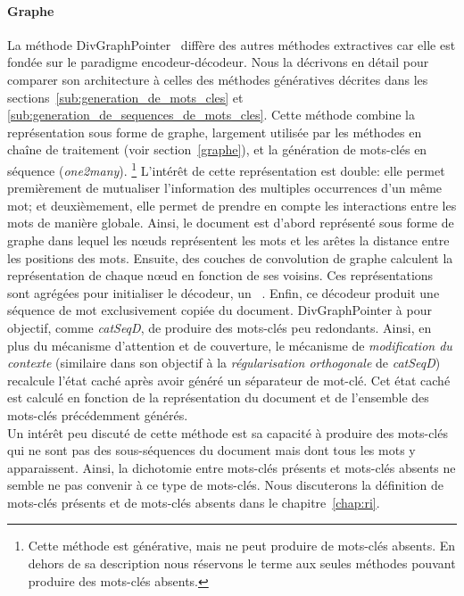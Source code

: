 \paragraph{Graphe}
La méthode DivGraphPointer~\cite{sun_divgraphpointer_2019} diffère des autres méthodes extractives car elle est fondée sur le paradigme encodeur-décodeur.
Nous la décrivons en détail pour comparer son architecture à celles des méthodes génératives décrites dans les sections~\ref{sub:generation_de_mots_cles} et \ref{sub:generation_de_sequences_de_mots_cles}.
%
Cette méthode combine la représentation sous forme de graphe, largement utilisée par les méthodes en chaîne de traitement (voir section~\ref{graphe}), et la génération de mots-clés en séquence (\emph{one2many}).%
\footnote{Cette méthode est générative, mais ne peut produire de mots-clés absents. En dehors de sa description nous réservons le terme  aux seules méthodes pouvant produire des mots-clés absents.}
L'intérêt de cette représentation est double: elle permet premièrement de mutualiser l'information des multiples occurrences d'un même mot; et deuxièmement, elle permet de prendre en compte les interactions entre les mots de manière globale.
%
Ainsi, le document est d'abord représenté sous forme de graphe dans lequel les n\oe{}uds représentent les mots et les arêtes la distance entre les positions des mots.
Ensuite, des couches de convolution de graphe calculent la représentation de chaque n\oe{}ud en fonction de ses voisins.
Ces représentations sont agrégées pour initialiser le décodeur, un ~\cite{vinyals_order_2016}.
Enfin, ce décodeur produit une séquence de mot exclusivement copiée du document.
%
DivGraphPointer à pour objectif, comme \emph{catSeqD}, de produire des mots-clés peu redondants.
Ainsi, en plus du mécanisme d'attention et de couverture, le mécanisme de \emph{modification du contexte} (similaire dans son objectif à la \emph{régularisation orthogonale} de \emph{catSeqD}) recalcule l'état caché après avoir généré un séparateur de mot-clé.
Cet état caché est calculé en fonction de la représentation du document et de l'ensemble des mots-clés précédemment générés.\\
%
Un intérêt peu discuté de cette méthode est sa capacité à produire des mots-clés qui ne sont pas des sous-séquences du document mais dont tous les mots y apparaissent.
Ainsi, la dichotomie entre mots-clés présents et mots-clés absents ne semble ne pas convenir à ce type de mots-clés.
Nous discuterons la définition de mots-clés présents et de mots-clés absents dans le chapitre~\ref{chap:ri}.


